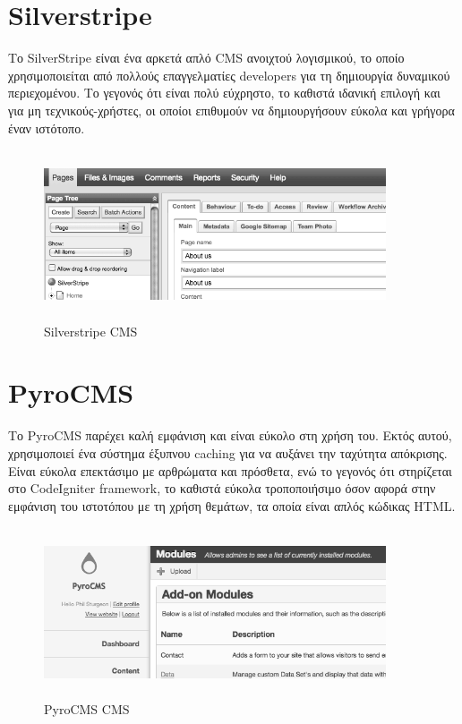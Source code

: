 \documentclass[12pt]{report}
\begin{document}
\section{\textlatin{Silverstripe}}
Το \textlatin{SilverStripe} είναι ένα αρκετά απλό \textlatin{CMS} ανοιχτού λογισμικού, το οποίο χρησιμοποιείται από πολλούς επαγγελματίες \textlatin{developers} για τη δημιουργία δυναμικού περιεχομένου. Το γεγονός ότι είναι πολύ εύχρηστο, το καθιστά ιδανική επιλογή και για μη τεχνικούς-χρήστες, οι οποίοι επιθυμούν να δημιουργήσουν εύκολα και γρήγορα έναν ιστότοπο.
\begin{figure}[H]
\centering
\includegraphics[width=0.9\textwidth, height=5cm]{silverstripe-gray}
\caption{\textlatin{Silverstripe CMS}}
\label{fig:silverstripe}
\end{figure}

\section{\textlatin{PyroCMS}}
Το \textlatin{PyroCMS} παρέχει καλή εμφάνιση και είναι εύκολο στη χρήση του. Εκτός αυτού, χρησιμοποιεί ένα σύστημα έξυπνου \textlatin{caching} για να αυξάνει την ταχύτητα απόκρισης. Είναι εύκολα επεκτάσιμο με αρθρώματα και πρόσθετα, ενώ το γεγονός ότι στηρίζεται στο \textlatin{CodeIgniter framework}, το καθιστά εύκολα τροποποιήσιμο όσον αφορά στην εμφάνιση του ιστοτόπου με τη χρήση θεμάτων, τα οποία είναι απλός κώδικας \textlatin{HTML}.
\begin{figure}[H]
\centering
\includegraphics[width=0.9\textwidth, height=5cm]{pyrocms-gray}
\caption{\textlatin{PyroCMS CMS}}
\label{fig:pyrocms}
\end{figure}
\end{document}
